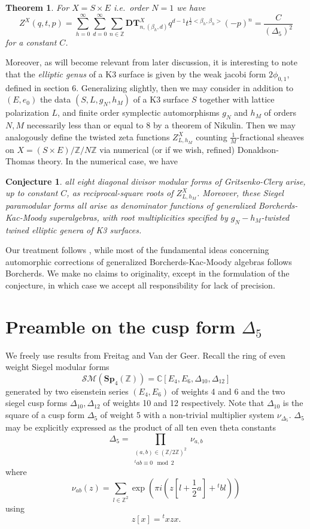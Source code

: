 \documentclass[9pt]{amsart} \usepackage[utf8]{inputenc}
\newtheorem{conjecture}{Conjecture}
\newtheorem{theorem}{Theorem}
\newcommand{\Z}{\mathbb{Z}} \newcommand{\C}{\mathbb{C}}
\newcommand{\Sp}{\mathbf{Sp}}
\begin{document}
\begin{theorem}
For $X = S\times E$ i.e.\ order $N = 1$ we have $$Z^X(q,t,p)=
\sum_{h=0}^{\infty}\sum_{d=0}^{\infty}\sum_{n\in\mathbb{Z}}
\mathbf{DT}^X_{n,(\beta_h,d)}q^{d-1}t^{\frac{1}{2}<\beta_h,\beta_h>}(-p)^n
= \frac{C}{(\Delta_5)^2}$$ for a constant $C$.\end{theorem} Moreover,
as will become relevant from later discussion, it is interesting to note
that the \textit{elliptic genus} of a K3 surface is given by the weak
jacobi form $2\phi_{0,1}$, defined in section 6. Generalizing slightly,
then we may consider in addition to $(E,e_0)$ the data $(S,L, g_N,h_M)$
of a K3 surface $S$ together with lattice polarization $L$, and finite
order symplectic automorphisms $g_N$ and $h_M$ of orders $N,M$
necessarily less than or equal to $8$ by a theorem of
Nikulin\cite{NIKULIN}. Then we may analogously define the twisted zeta
functions $Z^X_{L,h_M}$ counting $\frac{1}{M}$-fractional sheaves on $X
= (S\times E)/{\Z/N\Z}$ via numerical (or if we wish, refined)
Donaldson-Thomas theory. In the numerical case, we have
\begin{conjecture}
all eight diagonal divisor modular forms of Gritsenko-Clery arise, up to
constant $C$, as reciprocal-square roots of $Z^X_{L,h_M}$. Moreover,
these Siegel paramodular forms all arise as denominator functions of
generalized Borcherds-Kac-Moody superalgebras, with root multiplicities
specified by $g_N-h_M$-twisted twined elliptic genera of K3 surfaces.

\end{conjecture}

Our treatment follows \cite{GN}, while most of the fundamental ideas
concerning automorphic corrections of generalized Borcherds-Kac-Moody
algebras follows Borcherds\cite{B}. We make no claims to originality,
except in the formulation of the conjecture, in which case we accept all
responsibility for lack of precision.


\section{Preamble on the cusp form $\Delta_5$}

We freely use results from Freitag\cite{FREITAG:1} and Van der
Geer\cite{VDGEER:1}. Recall the ring of even weight Siegel modular
forms $$\mathcal{SM}(\Sp_4(\Z)) = \C[E_4,E_6,\Delta_{10},\Delta_{12}]$$
generated by two eisenstein series $(E_4,E_6)$ of weights 4 and 6 and
the two siegel cusp forms $\Delta_{10},\Delta_{12}$ of weights 10 and 12
respectively. Note that $\Delta_{10}$ is the square of a cusp form
$\Delta_5$ of weight 5 with a non-trivial multiplier system $\nu_{\Delta_5}$.
$\Delta_5$ may be explicitly expressed as the product of all ten even theta
constants $$\Delta_5 = \displaystyle\prod_{\substack{(a,b)\in (\Z/2\Z)^2\\{}^t ab
\equiv 0 \mod 2}}\nu_{a,b}$$
where $$\nu_{ab}(z) =\displaystyle\sum_{l\in\Z^2} \exp(\pi i (z[l +
\frac{1}{2}a] + {}^tbl))$$ using $$z[x] = {}^tx z x.$$
\end{document}
